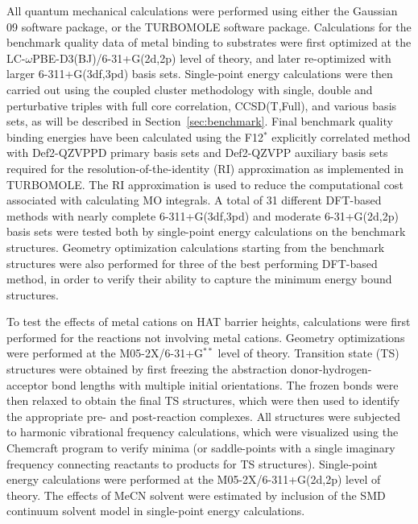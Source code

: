 All quantum mechanical calculations were performed using either the Gaussian 09 software package,\cite{Frisch2009} or the TURBOMOLE software package.\cite{turbomole} Calculations for the benchmark quality data of metal binding to substrates were first optimized at the LC-$\omega$PBE-D3(BJ)/6-31+G(2d,2p) level of theory,\cite{Vydrov2006, Vydrov2006a, Grimme2010, Johnson2006} and later re-optimized with larger 6-311+G(3df,3pd) basis sets. Single-point energy calculations were then carried out using the coupled cluster methodology with single, double and perturbative triples with full core correlation, CCSD(T,Full), and various basis sets, as will be described in Section~\ref{sec:benchmark}. Final benchmark quality binding energies have been calculated using the F12$^*$ explicitly correlated method with Def2-QZVPPD primary basis sets and Def2-QZVPP auxiliary basis sets required for the resolution-of-the-identity (RI) approximation as implemented in TURBOMOLE. The RI approximation is used to reduce the computational cost associated with calculating MO integrals. A total of 31 different DFT-based methods with nearly complete 6-311+G(3df,3pd) and moderate 6-31+G(2d,2p) basis sets were tested both by single-point energy calculations on the benchmark structures. Geometry optimization calculations starting from the benchmark structures were also performed for three of the best performing DFT-based method, in order to verify their ability to capture the minimum energy bound structures.

To test the effects of metal cations on HAT barrier heights, calculations were first performed for the reactions not involving metal cations. Geometry optimizations were performed at the M05-2X\cite{Zhao2006}/6-31+G$^{**}$ level of theory. Transition state (TS) structures were obtained by first freezing the abstraction donor-hydrogen-acceptor bond lengths with multiple initial orientations. The frozen bonds were then relaxed to obtain the final TS structures, which were then used to identify the appropriate pre- and post-reaction complexes. All structures were subjected to harmonic vibrational frequency calculations, which were visualized using the Chemcraft program\cite{ccraft} to verify minima (or saddle-points with a single imaginary frequency connecting reactants to products for TS structures). Single-point energy calculations were performed at the M05-2X/6-311+G(2d,2p) level of theory. The effects of MeCN solvent were estimated by inclusion of the SMD\cite{Marenich2009} continuum solvent model in single-point energy calculations.


